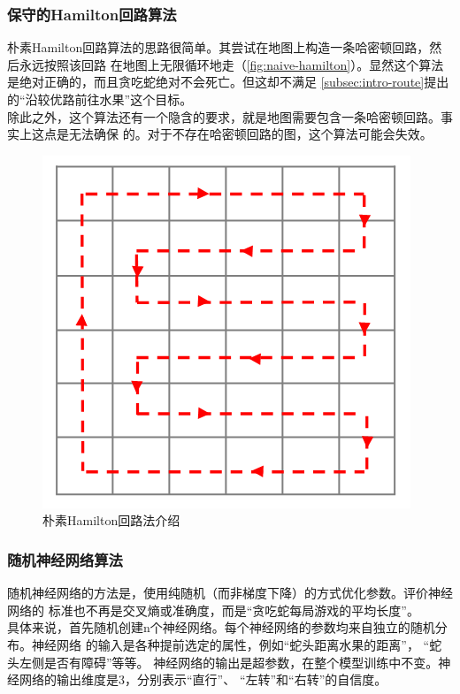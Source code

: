 \documentclass[a4paper]{article}
\begin{document}
\subsubsection{保守的Hamilton回路算法}
朴素Hamilton回路算法的思路很简单。其尝试在地图上构造一条哈密顿回路，然后永远按照该回路
在地图上无限循环地走（\autoref{fig:naive-hamilton}）。显然这个算法是绝对正确的，而且贪吃蛇绝对不会死亡。但这却不满足
\autoref{subsec:intro-route}提出的``沿较优路前往水果''这个目标。\\

除此之外，这个算法还有一个隐含的要求，就是地图需要包含一条哈密顿回路。事实上这点是无法确保
的。对于不存在哈密顿回路的图，这个算法可能会失效。

\begin{figure}[!hbt]
    \begin{center}
    \includegraphics[scale=0.5]{assets/naive-hamilton}
    \caption{朴素Hamilton回路法介绍\label{fig:naive-hamilton}} 
    \end{center} 
\end{figure} 

\subsubsection{随机神经网络算法}
随机神经网络的方法是，使用纯随机（而非梯度下降）的方式优化参数。评价神经网络的
标准也不再是交叉熵或准确度，而是``贪吃蛇每局游戏的平均长度''。\\

具体来说，首先随机创建n个神经网络。每个神经网络的参数均来自独立的随机分布。神经网络
的输入是各种提前选定的属性，例如``蛇头距离水果的距离''， ``蛇头左侧是否有障碍''等等。
神经网络的输出是超参数，在整个模型训练中不变。神经网络的输出维度是3，分别表示``直行''、
``左转''和``右转''的自信度。\\
\end{document}
